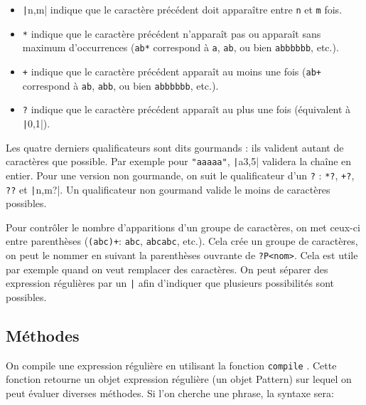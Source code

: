 \documentclass[a4paper, 10pt]{article}
\begin{document}
\begin{description}
\begin{itemize}
              \item \og\texttt|{n,m}|\fg{} indique que le caractère précédent doit apparaître entre \texttt{n} et \texttt{m} fois.
              \item \og\texttt{*}\fg{} indique que le caractère précédent n'apparaît pas ou apparaît sans maximum d'occurrences (\texttt{ab*} correspond à \texttt{a}, \texttt{ab}, ou bien \texttt{abbbbbb}, etc.).
              \item \og\texttt{+}\fg{} indique que le caractère précédent apparaît au moins une fois (\texttt{ab+} correspond à \texttt{ab}, \texttt{abb}, ou bien \texttt{abbbbbb}, etc.).
              \item \og\texttt{?}\fg{} indique que le caractère précédent apparaît au plus une fois (équivalent à \texttt|{0,1}|).
          \end{itemize}
\end{description}

Les quatre derniers qualificateurs sont dits gourmands : ils valident autant de caractères que possible. Par exemple pour \texttt{"aaaaa"}, \texttt|a{3,5}| validera la chaîne en entier. Pour une version non gourmande, on suit le qualificateur d'un \texttt{?} : \texttt{*?}, \texttt{+?}, \texttt{??} et \texttt|{n,m}?|. Un qualificateur non gourmand valide le moins de caractères possibles.\medskip

Pour contrôler le nombre d'apparitions d'un groupe de caractères, on met ceux-ci entre parenthèses (\texttt{(abc)+}: \texttt{abc}, \texttt{abcabc}, etc.). Cela crée un groupe de caractères, on peut le nommer en suivant la parenthèses ouvrante de \texttt{?P<nom>}. Cela est utile par exemple quand on veut remplacer des caractères. On peut séparer des expression régulières par un \texttt{|} afin d'indiquer que plusieurs possibilités sont possibles.\medskip

\subsection{Méthodes}
On compile une expression régulière en utilisant la fonction \texttt{compile} . Cette fonction retourne un objet expression régulière (un objet Pattern) sur lequel on peut évaluer diverses méthodes. Si l'on cherche une phrase, la syntaxe sera:
\end{document}
